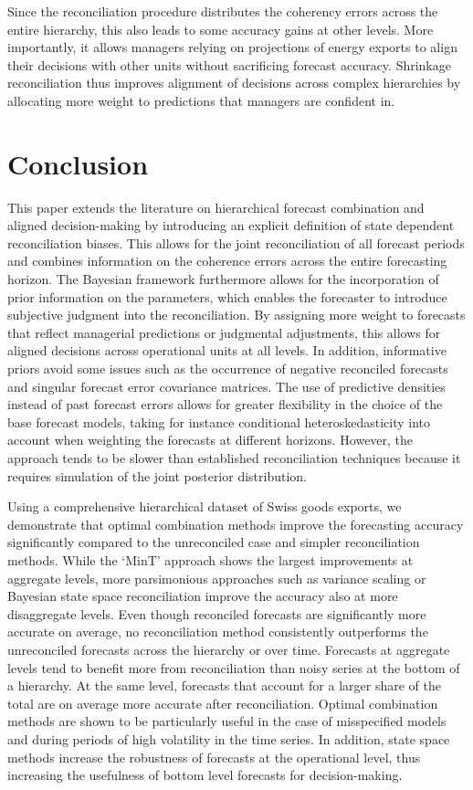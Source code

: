 \documentclass[a4paper,fleqn,11pt]{article}
\begin{document}
Since the reconciliation procedure distributes the coherency errors across the entire hierarchy, this also leads to some accuracy gains at other levels. More importantly, it allows managers relying on projections of energy exports to align their decisions with other units without sacrificing forecast accuracy. Shrinkage reconciliation thus improves alignment of decisions across complex hierarchies by allocating more weight to predictions that managers are confident in. 


\section{Conclusion}\label{sec:conc}

This paper extends the literature on hierarchical forecast combination and aligned decision-making by introducing an explicit definition of state dependent reconciliation biases. This allows for the joint reconciliation of all forecast periods and combines information on the coherence errors across the entire forecasting horizon. The Bayesian framework furthermore allows for the incorporation of prior information on the parameters, which enables the forecaster to introduce subjective judgment into the reconciliation. By assigning more weight to forecasts that reflect managerial predictions or judgmental adjustments, this allows for aligned decisions across operational units at all levels. In addition, informative priors avoid some issues such as the occurrence of negative reconciled forecasts and singular forecast error covariance matrices. The use of predictive densities instead of past forecast errors allows for greater flexibility in the choice of the base forecast models, taking for instance conditional heteroskedasticity into account when weighting the forecasts at different horizons. However, the approach tends to be slower than established reconciliation techniques because it requires simulation of the joint posterior distribution.

Using a comprehensive hierarchical dataset of Swiss goods exports, we demonstrate that optimal combination methods improve the forecasting accuracy significantly compared to the unreconciled case and simpler reconciliation methods. While the `MinT' approach shows the largest improvements at aggregate levels, more parsimonious approaches such as variance scaling or Bayesian state space reconciliation improve the accuracy also at more disaggregate levels. Even though reconciled forecasts are significantly more accurate on average, no reconciliation method consistently outperforms the unreconciled forecasts across the hierarchy or over time. Forecasts at aggregate levels tend to benefit more from reconciliation than noisy series at the bottom of a hierarchy. At the same level, forecasts that account for a larger share of the total are on average more accurate after reconciliation.  Optimal combination methods are shown to be particularly useful in the case of misspecified models and during periods of high volatility in the time series. In addition, state space methods increase the robustness of forecasts at the operational level, thus increasing the usefulness of bottom level forecasts for decision-making.




\clearpage


\end{document}
